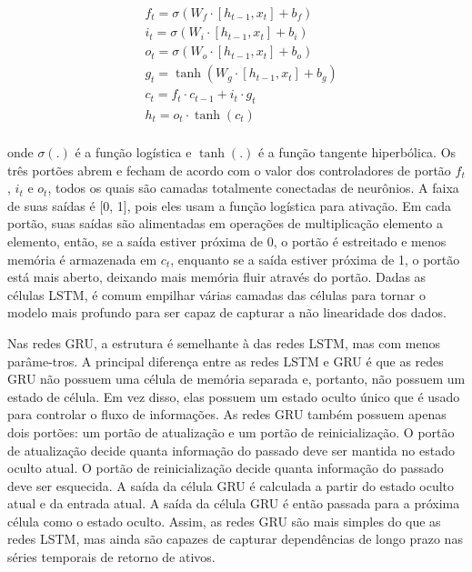             \begin{equation}
                \label{eq:lstm}
                \begin{aligned}
                    & f_t = \sigma(W_f \cdot [h_{t-1}, x_t] + b_f) \\
                    & i_t = \sigma(W_i \cdot [h_{t-1}, x_t] + b_i) \\
                    & o_t = \sigma(W_o \cdot [h_{t-1}, x_t] + b_o) \\
                    & g_t = \tanh(W_g \cdot [h_{t-1}, x_t] + b_g) \\
                    & c_t = f_t \cdot c_{t-1} + i_t \cdot g_t \\
                    & h_t = o_t \cdot \tanh(c_t) \\
                \end{aligned}
            \end{equation}

            \noindent onde $\sigma(.)$ é a função logística e $\tanh(.)$ é a função tangente hiperbólica. Os três portões abrem e fecham de acordo com o valor dos controladores de portão $f_t$, $i_t$ e $o_t$, todos os quais são camadas totalmente conectadas de neurônios. A faixa de suas saídas é [0, 1], pois eles usam a função logística para ativação. Em cada portão, suas saídas são alimentadas em operações de multiplicação elemento a elemento, então, se a saída estiver próxima de 0, o portão é estreitado e menos memória é armazenada em $c_t$, enquanto se a saída estiver próxima de 1, o portão está mais aberto, deixando mais memória fluir através do portão. Dadas as células \acrshort{LSTM}, é comum empilhar várias camadas das células para tornar o modelo mais profundo para ser capaz de capturar a não linearidade dos dados. 

            \ipar Nas redes \acrshort{GRU}, a estrutura é semelhante à das redes \acrshort{LSTM}, mas com menos parâme-tros. A principal diferença entre as redes \acrshort{LSTM} e \acrshort{GRU} é que as redes \acrshort{GRU} não possuem uma célula de memória separada e, portanto, não possuem um estado de célula. Em vez disso, elas possuem um estado oculto único que é usado para controlar o fluxo de informações. As redes \acrshort{GRU} também possuem apenas dois portões: um portão de atualização e um portão de reinicialização. O portão de atualização decide quanta informação do passado deve ser mantida no estado oculto atual. O portão de reinicialização decide quanta informação do passado deve ser esquecida. A saída da célula \acrshort{GRU} é calculada a partir do estado oculto atual e da entrada atual. A saída da célula \acrshort{GRU} é então passada para a próxima célula como o estado oculto. Assim, as redes \acrshort{GRU} são mais simples do que as redes \acrshort{LSTM}, mas ainda são capazes de capturar dependências de longo prazo nas séries temporais de retorno de ativos.
        
